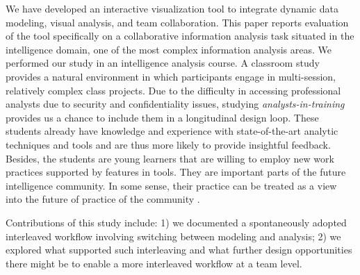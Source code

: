We have developed an interactive visualization tool to integrate dynamic data modeling, visual analysis, and team collaboration. This paper reports evaluation of the tool specifically on a collaborative information analysis task
situated in the intelligence domain, one of the most complex information
analysis areas. We performed our study in an intelligence analysis course. A
classroom study provides a natural environment in which participants engage in
multi-session, relatively complex class projects. Due to the difficulty in
accessing professional analysts due to security and confidentiality issues,
studying \emph{analysts-in-training} provides us a chance to include them in a
longitudinal design loop. These students already have knowledge and experience
with state-of-the-art analytic techniques and tools and are thus more likely to
provide insightful feedback. Besides, the students are young learners that are
willing to employ new work practices supported by features in tools. They are
important parts of the future intelligence community. In some sense, their
practice can be treated as a view into the future of practice of the community
\cite{Martin2014}.

Contributions of this study include: 1) we documented a spontaneously adopted
interleaved workflow involving switching between modeling and analysis; 2) we
explored what supported such interleaving and what further design opportunities
there might be to enable a more interleaved workflow at a team level.
